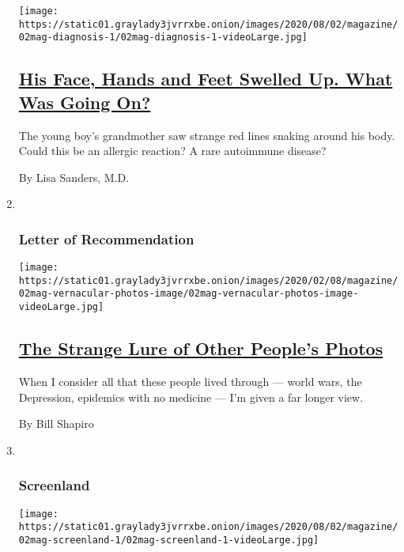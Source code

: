 \begin{enumerate}
  \texttt{[image: https://static01.graylady3jvrrxbe.onion/images/2020/08/02/magazine/02mag-diagnosis-1/02mag-diagnosis-1-videoLarge.jpg]}

  \hypertarget{his-face-hands-and-feet-swelled-up-what-was-going-on}{%
  \subsection{\texorpdfstring{\href{/2020/07/30/magazine/urticaria-multiforme.html}{His
  Face, Hands and Feet Swelled Up. What Was Going
  On?}}{His Face, Hands and Feet Swelled Up. What Was Going On?}}\label{his-face-hands-and-feet-swelled-up-what-was-going-on}}

  The young boy's grandmother saw strange red lines snaking around his
  body. Could this be an allergic reaction? A rare autoimmune disease?

  By Lisa Sanders, M.D.
\item ~
  \hypertarget{letter-of-recommendation}{%
  \subsubsection{Letter of
  Recommendation}\label{letter-of-recommendation}}

  \texttt{[image: https://static01.graylady3jvrrxbe.onion/images/2020/02/08/magazine/02mag-vernacular-photos-image/02mag-vernacular-photos-image-videoLarge.jpg]}

  \hypertarget{the-strange-lure-of-other-peoples-photos}{%
  \subsection{\texorpdfstring{\href{/2020/07/30/magazine/the-strange-lure-of-other-peoples-photos.html}{The
  Strange Lure of Other People's
  Photos}}{The Strange Lure of Other People's Photos}}\label{the-strange-lure-of-other-peoples-photos}}

  When I consider all that these people lived through --- world wars,
  the Depression, epidemics with no medicine --- I'm given a far longer
  view.

  By Bill Shapiro
\item ~
  \hypertarget{screenland}{%
  \subsubsection{Screenland}\label{screenland}}

  \texttt{[image: https://static01.graylady3jvrrxbe.onion/images/2020/08/02/magazine/02mag-screenland-1/02mag-screenland-1-videoLarge.jpg]}


\end{enumerate}
